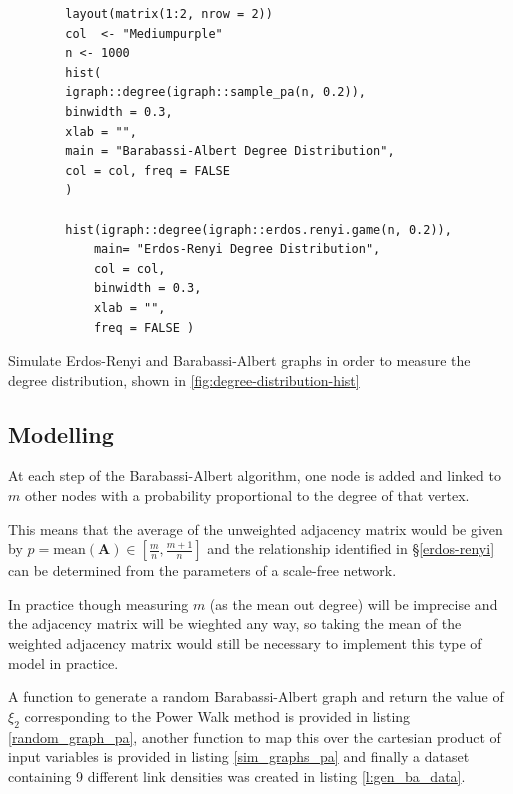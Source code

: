 \documentclass[11pt]{report}
\begin{document}


\begin{listing}[htbp]
    \begin{tcolorbox}
        \begin{verbatim}
        layout(matrix(1:2, nrow = 2))
        col  <- "Mediumpurple"
        n <- 1000
        hist(
        igraph::degree(igraph::sample_pa(n, 0.2)),
        binwidth = 0.3,
        xlab = "",
        main = "Barabassi-Albert Degree Distribution",
        col = col, freq = FALSE
        )

        hist(igraph::degree(igraph::erdos.renyi.game(n, 0.2)),
            main= "Erdos-Renyi Degree Distribution",
            col = col,
            binwidth = 0.3,
            xlab = "",
            freq = FALSE )
        \end{verbatim}
    \end{tcolorbox}
\caption{\label{degree-distribution-hist}Simulate Erdos-Renyi and Barabassi-Albert graphs in order to measure the degree distribution,  shown in \ref{fig:degree-distribution-hist}}
\end{listing}



\subsection{Modelling}
\label{sec:orgb52cc3e}
At each step of the Barabassi-Albert algorithm, one node is added and linked to \(m\) other nodes with a probability proportional to the degree of that vertex.

This means that the average of the unweighted adjacency matrix would be given by \(p = \mathrm{mean}\left(\mathbf{A}\right) \in \left[ \frac{m}{n}, \frac{m+1}{n} \right]\) and the relationship identified in  \S \ref{erdos-renyi} can be determined from the parameters of a scale-free network.

In practice though measuring \(m\) (as the mean out degree) will be imprecise and the adjacency matrix will be wieghted any way, so taking the mean of the weighted adjacency matrix would still be necessary to implement this type of model in practice.

A function to generate a random Barabassi-Albert graph and return the value of
\(\xi_{2}\) corresponding to the Power Walk method is provided in listing
\ref{random_graph_pa}, another function to map this over the cartesian product of
input variables is provided in listing \ref{sim_graphs_pa} and finally a dataset containing 9
different link densities was created in listing \ref{l:gen_ba_data}.
\end{document}
